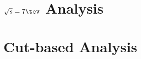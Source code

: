 \section{$\sqrts=7 \tev$ Analysis}
\label{chap:analysis:sec:reanalysis}


\section{Cut-based Analysis}
\label{chap:analysis:sec:cutbased}






